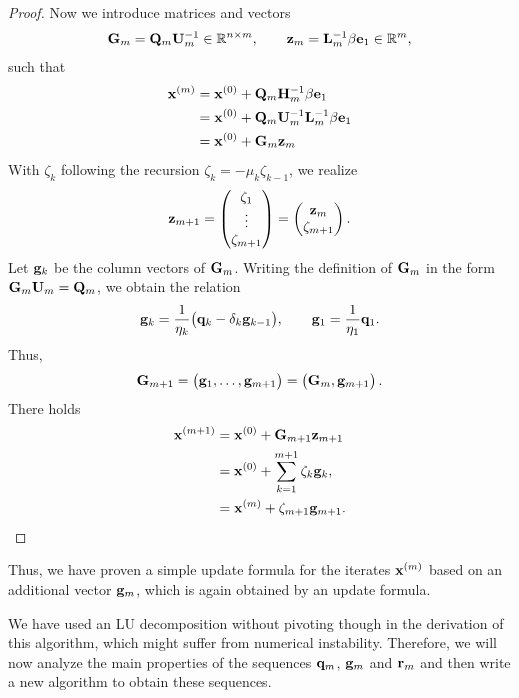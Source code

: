 \begin{proof}
  Now we introduce matrices and vectors
  \begin{gather}
    \mathbf G_m = \mathbf Q_m \mathbf U_m^{-1} \in \mathbb R^{n\times m},
    \qquad \mathbf z_m = \mathbf L_m^{-1} \beta \mathbf e_1\in \mathbb R^m,
  \end{gather}
  such that
  \begin{align}
    \mathbf x^{(m)}
    &= \mathbf x^{(0)} + \mathbf Q_m \mathbf H_m^{-1}\beta \mathbf e_1\\
    &= \mathbf x^{(0)} + \mathbf Q_m \mathbf U_m^{-1} \mathbf L_m^{-1} \beta \mathbf e_1\\
    &= \mathbf x^{(0)} + \mathbf G_m \mathbf z_m
  \end{align}
  With $\zeta_k$ following the recursion
  $\zeta_k = - \mu_k \zeta_{k-1}$, we realize
  \begin{gather}
    \mathbf z_{m+1} =
    \begin{pmatrix}
      \zeta_1\\\vdots\\\zeta_{m+1}
    \end{pmatrix}
    =
    \begin{pmatrix}
      \mathbf z_{m}\\\zeta_{m+1}
    \end{pmatrix}.
  \end{gather}
  Let $\mathbf g_k$ be the column vectors of $\mathbf G_m$. Writing the
  definition of $\mathbf G_m$ in the form $\mathbf G_m \mathbf U_m = \mathbf Q_m$, we
  obtain the relation
  \begin{gather}
    \label{eq:nla:krylov:lanczos-p}
    \mathbf g_k = \frac1{\eta_k}\bigl(\mathbf q_k - \delta_k \mathbf g_{k-1}\bigr),
    \qquad\mathbf g_1 = \frac1{\eta_1} \mathbf q_1.
  \end{gather}
  Thus,
  \begin{gather}
    \mathbf G_{m+1} =
    \begin{pmatrix}
      \mathbf g_1,\dots,\mathbf g_{m+1}
    \end{pmatrix}
    =
    \begin{pmatrix}
      \mathbf G_{m},\mathbf g_{m+1}
    \end{pmatrix}.
  \end{gather}
  There holds
  \begin{align}
    \mathbf x^{(m+1)}
    &= \mathbf x^{(0)} + \mathbf G_{m+1}\mathbf z_{m+1}\\
    &= \mathbf x^{(0)} + \sum_{k=1}^{m+1} \zeta_k \mathbf g_k,\\
    &= \mathbf x^{(m)} + \zeta_{m+1} \mathbf g_{m+1}.
  \end{align}
\end{proof}

\begin{remark}
  Thus, we have proven a simple update formula for the iterates
  $\mathbf x^{(m)}$ based on an additional vector $\mathbf g_m$, which is again
  obtained by an update formula.

  We have used an LU decomposition without pivoting though in the
  derivation of this algorithm, which might suffer from numerical
  instability. Therefore, we will now analyze the main properties of
  the sequences $\mathbf q_m$, $\mathbf g_m$ and $\mathbf r_m$ and then write a new
  algorithm to obtain these sequences.
\end{remark}

